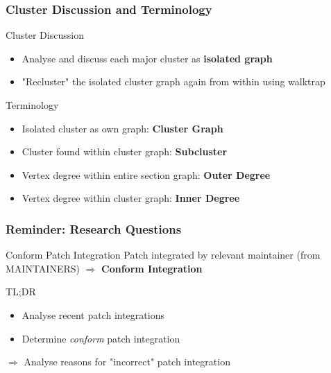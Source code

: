 \documentclass{beamer}
\begin{document}
	\begin{frame}
	\frametitle{Cluster Discussion and Terminology}
		\begin{alertblock}{Cluster Discussion}
			\begin{itemize}
				\item Analyse and discuss each major cluster as \textbf{isolated graph}
				\item "Recluster" the isolated cluster graph again from within using walktrap
			\end{itemize}
		\end{alertblock}
		
		\begin{block}{Terminology}
			\begin{itemize}
				\item Isolated cluster as own graph: \textbf{Cluster Graph}
				\item Cluster found within cluster graph: \textbf{Subcluster}
				\item Vertex degree within entire section graph: \textbf{Outer Degree}
				\item Vertex degree within cluster graph: \textbf{Inner Degree}
			\end{itemize}
		\end{block}
	\end{frame}



	\begin{frame}
	\frametitle{Reminder: Research Questions}
		\begin{alertblock}{Conform Patch Integration}
			Patch integrated by relevant maintainer (from MAINTAINERS) $\Rightarrow$ \textbf{Conform Integration}
		\end{alertblock}

		\begin{block}{TL;DR}
			\begin{itemize}
				\item Analyse recent patch integrations
				\item Determine \textit{conform} patch integration
			\end{itemize}
		\end{block}
		$\Rightarrow$ Analyse reasons for "incorrect" patch integration
	\end{frame}
\end{document}
